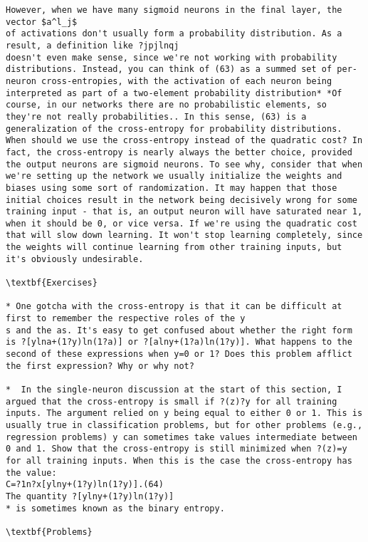 \begin{lstlisting}
However, when we have many sigmoid neurons in the final layer, the vector $a^l_j$
of activations don't usually form a probability distribution. As a result, a definition like ?jpjlnqj
doesn't even make sense, since we're not working with probability distributions. Instead, you can think of (63) as a summed set of per-neuron cross-entropies, with the activation of each neuron being interpreted as part of a two-element probability distribution* *Of course, in our networks there are no probabilistic elements, so they're not really probabilities.. In this sense, (63) is a generalization of the cross-entropy for probability distributions.
When should we use the cross-entropy instead of the quadratic cost? In fact, the cross-entropy is nearly always the better choice, provided the output neurons are sigmoid neurons. To see why, consider that when we're setting up the network we usually initialize the weights and biases using some sort of randomization. It may happen that those initial choices result in the network being decisively wrong for some training input - that is, an output neuron will have saturated near 1, when it should be 0, or vice versa. If we're using the quadratic cost that will slow down learning. It won't stop learning completely, since the weights will continue learning from other training inputs, but it's obviously undesirable.

\textbf{Exercises}

* One gotcha with the cross-entropy is that it can be difficult at first to remember the respective roles of the y
s and the as. It's easy to get confused about whether the right form is ?[ylna+(1?y)ln(1?a)] or ?[alny+(1?a)ln(1?y)]. What happens to the second of these expressions when y=0 or 1? Does this problem afflict the first expression? Why or why not? 

*  In the single-neuron discussion at the start of this section, I argued that the cross-entropy is small if ?(z)?y for all training inputs. The argument relied on y being equal to either 0 or 1. This is usually true in classification problems, but for other problems (e.g., regression problems) y can sometimes take values intermediate between 0 and 1. Show that the cross-entropy is still minimized when ?(z)=y for all training inputs. When this is the case the cross-entropy has the value: 
C=?1n?x[ylny+(1?y)ln(1?y)].(64)
The quantity ?[ylny+(1?y)ln(1?y)]
* is sometimes known as the binary entropy.

\textbf{Problems}


\end{lstlisting}
